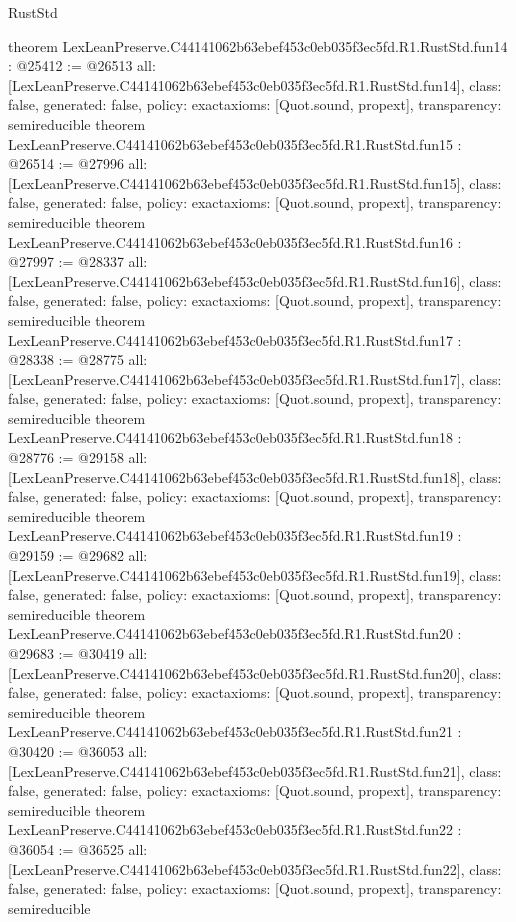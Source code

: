 \begin{lexlean}{RustStd}
\begin{coremodule}
{}
theorem LexLeanPreserve.C44141062b63ebef453c0eb035f3ec5fd.R1.RustStd.fun14 : @25412 := @26513 {
  all: [LexLeanPreserve.C44141062b63ebef453c0eb035f3ec5fd.R1.RustStd.fun14],
  class: false,
  generated: false,
  policy: exact{axioms: [Quot.sound, propext]},
  transparency: semireducible
}
theorem LexLeanPreserve.C44141062b63ebef453c0eb035f3ec5fd.R1.RustStd.fun15 : @26514 := @27996 {
  all: [LexLeanPreserve.C44141062b63ebef453c0eb035f3ec5fd.R1.RustStd.fun15],
  class: false,
  generated: false,
  policy: exact{axioms: [Quot.sound, propext]},
  transparency: semireducible
}
theorem LexLeanPreserve.C44141062b63ebef453c0eb035f3ec5fd.R1.RustStd.fun16 : @27997 := @28337 {
  all: [LexLeanPreserve.C44141062b63ebef453c0eb035f3ec5fd.R1.RustStd.fun16],
  class: false,
  generated: false,
  policy: exact{axioms: [Quot.sound, propext]},
  transparency: semireducible
}
theorem LexLeanPreserve.C44141062b63ebef453c0eb035f3ec5fd.R1.RustStd.fun17 : @28338 := @28775 {
  all: [LexLeanPreserve.C44141062b63ebef453c0eb035f3ec5fd.R1.RustStd.fun17],
  class: false,
  generated: false,
  policy: exact{axioms: [Quot.sound, propext]},
  transparency: semireducible
}
theorem LexLeanPreserve.C44141062b63ebef453c0eb035f3ec5fd.R1.RustStd.fun18 : @28776 := @29158 {
  all: [LexLeanPreserve.C44141062b63ebef453c0eb035f3ec5fd.R1.RustStd.fun18],
  class: false,
  generated: false,
  policy: exact{axioms: [Quot.sound, propext]},
  transparency: semireducible
}
theorem LexLeanPreserve.C44141062b63ebef453c0eb035f3ec5fd.R1.RustStd.fun19 : @29159 := @29682 {
  all: [LexLeanPreserve.C44141062b63ebef453c0eb035f3ec5fd.R1.RustStd.fun19],
  class: false,
  generated: false,
  policy: exact{axioms: [Quot.sound, propext]},
  transparency: semireducible
}
theorem LexLeanPreserve.C44141062b63ebef453c0eb035f3ec5fd.R1.RustStd.fun20 : @29683 := @30419 {
  all: [LexLeanPreserve.C44141062b63ebef453c0eb035f3ec5fd.R1.RustStd.fun20],
  class: false,
  generated: false,
  policy: exact{axioms: [Quot.sound, propext]},
  transparency: semireducible
}
theorem LexLeanPreserve.C44141062b63ebef453c0eb035f3ec5fd.R1.RustStd.fun21 : @30420 := @36053 {
  all: [LexLeanPreserve.C44141062b63ebef453c0eb035f3ec5fd.R1.RustStd.fun21],
  class: false,
  generated: false,
  policy: exact{axioms: [Quot.sound, propext]},
  transparency: semireducible
}
theorem LexLeanPreserve.C44141062b63ebef453c0eb035f3ec5fd.R1.RustStd.fun22 : @36054 := @36525 {
  all: [LexLeanPreserve.C44141062b63ebef453c0eb035f3ec5fd.R1.RustStd.fun22],
  class: false,
  generated: false,
  policy: exact{axioms: [Quot.sound, propext]},
  transparency: semireducible
}
\end{coremodule}
\end{lexlean}
